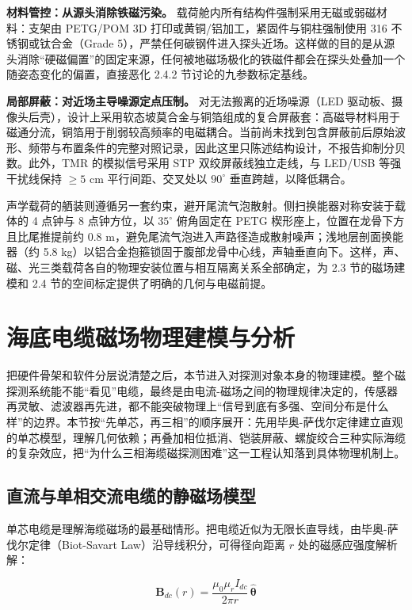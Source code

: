 \textbf{材料管控：从源头消除铁磁污染。} 载荷舱内所有结构件强制采用无磁或弱磁材料：支架由 PETG/POM 3D 打印或黄铜/铝加工，紧固件与铜柱强制使用 316 不锈钢或钛合金（Grade 5），严禁任何碳钢件进入探头近场。这样做的目的是从源头消除``硬磁偏置''的固定来源，任何被地磁场极化的铁磁件都会在探头处叠加一个随姿态变化的偏置，直接恶化 2.4.2 节讨论的九参数标定基线。

\textbf{局部屏蔽：对近场主导噪源定点压制。} 对无法搬离的近场噪源（LED 驱动板、摄像头后壳），设计上采用软态坡莫合金与铜箔组成的复合屏蔽套：高磁导材料用于磁通分流，铜箔用于削弱较高频率的电磁耦合。当前尚未找到包含屏蔽前后原始波形、频带与布置条件的完整对照记录，因此这里只陈述结构设计，不报告抑制分贝数。此外，TMR 的模拟信号采用 STP 双绞屏蔽线独立走线，与 LED/USB 等强干扰线保持 \(\geq 5\text{ cm}\) 平行间距、交叉处以 \(90^\circ\) 垂直跨越，以降低耦合。

声学载荷的舾装则遵循另一套约束，避开尾流气泡散射。侧扫换能器对称安装于载体的 4 点钟与 8 点钟方位，以 \(35^\circ\) 俯角固定在 PETG 楔形座上，位置在龙骨下方且比尾推提前约 0.8 m，避免尾流气泡进入声路径造成散射噪声；浅地层剖面换能器（约 5.8 kg）以铝合金抱箍锁固于腹部龙骨中心线，声轴垂直向下。这样，声、磁、光三类载荷各自的物理安装位置与相互隔离关系全部确定，为 2.3 节的磁场建模和 2.4 节的空间标定提供了明确的几何与电磁前提。

\section{海底电缆磁场物理建模与分析}\label{sec:ch02-2-3}

把硬件骨架和软件分层说清楚之后，本节进入对探测对象本身的物理建模。整个磁探测系统能不能``看见''电缆，最终是由电流-磁场之间的物理规律决定的，传感器再灵敏、滤波器再先进，都不能突破物理上``信号到底有多强、空间分布是什么样''的边界。本节按``先单芯，再三相''的顺序展开：先用毕奥-萨伐尔定律建立直观的单芯模型，理解几何依赖；再叠加相位抵消、铠装屏蔽、螺旋绞合三种实际海缆的复杂效应，把``为什么三相海缆磁探测困难''这一工程认知落到具体物理机制上。

\subsection{直流与单相交流电缆的静磁场模型}\label{sec:ch02-2-3-1}

单芯电缆是理解海缆磁场的最基础情形。把电缆近似为无限长直导线，由毕奥-萨伐尔定律（Biot-Savart Law）\cite{griffiths2017electrodynamics}沿导线积分，可得径向距离 \(r\) 处的磁感应强度解析解：

\begin{equation}
\boldsymbol{B}_{dc}(r) = \frac{\mu_0 \mu_r I_{dc}}{2\pi r}\,\hat{\boldsymbol{\theta}}
\label{eq:ch02-static-field}
\end{equation}

